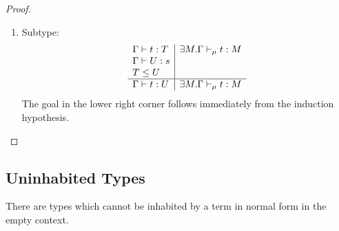 \begin{theorem}
\begin{proof}
\begin{enumerate}
\begin{enumerate}
                \item Subtype:
                $$
                \begin{array}{l|l}
                    \Gamma \vdash t : T
                    &
                    \exists M. \Gamma \vdash_\mu t: M
                    \\
                    \Gamma \vdash U : s
                    \\
                    T \le U
                    \\
                    \hline
                    \Gamma \vdash t : U
                    &
                    \exists M. \Gamma \vdash_\mu t: M
                \end{array}
                $$
                The goal in the lower right corner follows immediately from the
                    induction hypothesis.
            \end{enumerate}
        \end{enumerate}
    \end{proof}
\end{theorem}



\subsection{Uninhabited Types}



There are types which cannot be inhabited by a term in normal form in the empty
context.

